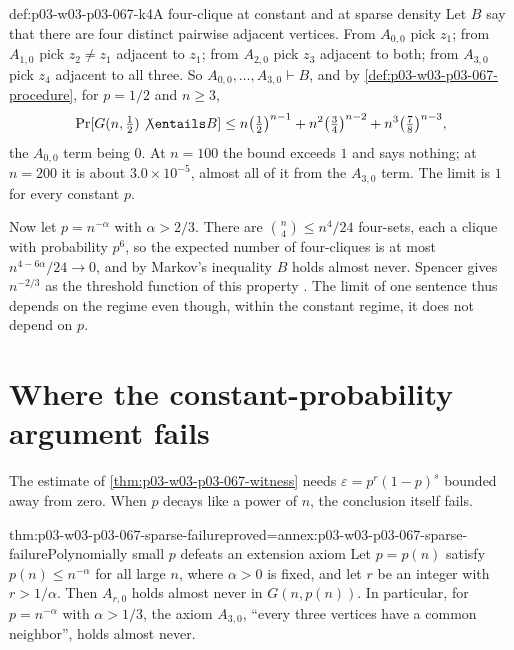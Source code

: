 \begin{hbexample}{def:p03-w03-p03-067-k4}{A four-clique at constant and at sparse density}
Let \(B\) say that there are four distinct pairwise adjacent vertices.  From
\(A_{0,0}\) pick \(z_1\); from \(A_{1,0}\) pick \(z_2\neq z_1\) adjacent to
\(z_1\); from \(A_{2,0}\) pick \(z_3\) adjacent to both; from \(A_{3,0}\) pick
\(z_4\) adjacent to all three.  So \(A_{0,0},\ldots,A_{3,0}\vdash B\), and by
\cref{def:p03-w03-p03-067-procedure}, for \(p=1/2\) and \(n\geq3\),
\[
 \Pr[G(n,\tfrac12)\not\entails B]\leq
 n\bigl(\tfrac12\bigr)^{n-1}+n^2\bigl(\tfrac34\bigr)^{n-2}
 +n^3\bigl(\tfrac78\bigr)^{n-3},
\]
the \(A_{0,0}\) term being \(0\).  At \(n=100\) the bound exceeds \(1\) and says
nothing; at \(n=200\) it is about \(3.0\times10^{-5}\), almost all of it from the
\(A_{3,0}\) term.  The limit is \(1\) for every constant \(p\).

Now let \(p=n^{-\alpha}\) with \(\alpha>2/3\).  There are \(\binom n4\leq n^4/24\)
four-sets, each a clique with probability \(p^6\), so the expected number of
four-cliques is at most \(n^{4-6\alpha}/24\to0\), and by Markov's inequality
\(B\) holds almost never.  Spencer gives \(n^{-2/3}\) as the threshold
function of this property \cite[p.~4]{Spencer2007LogicRandomStructuresAuthor}.
The limit of one sentence thus depends on the regime even though, within
the constant regime, it does not depend on \(p\).
\end{hbexample}

\section{Where the constant-probability argument fails}
\label{sec:p03-w03-p03-067-limits}

The estimate of \cref{thm:p03-w03-p03-067-witness} needs
\(\varepsilon=p^r(1-p)^s\) bounded away from zero.  When \(p\) decays like a
power of \(n\), the conclusion itself fails.

\begin{hbtheorem}{thm:p03-w03-p03-067-sparse-failure}{proved=annex:p03-w03-p03-067-sparse-failure}{Polynomially small \(p\) defeats an extension axiom}
Let \(p=p(n)\) satisfy \(p(n)\leq n^{-\alpha}\) for all large \(n\), where
\(\alpha>0\) is fixed, and let \(r\) be an integer with \(r>1/\alpha\).  Then
\(A_{r,0}\) holds almost never in \(G(n,p(n))\).  In particular, for
\(p=n^{-\alpha}\) with \(\alpha>1/3\), the axiom \(A_{3,0}\), ``every three
vertices have a common neighbor'', holds almost never.
\end{hbtheorem}

